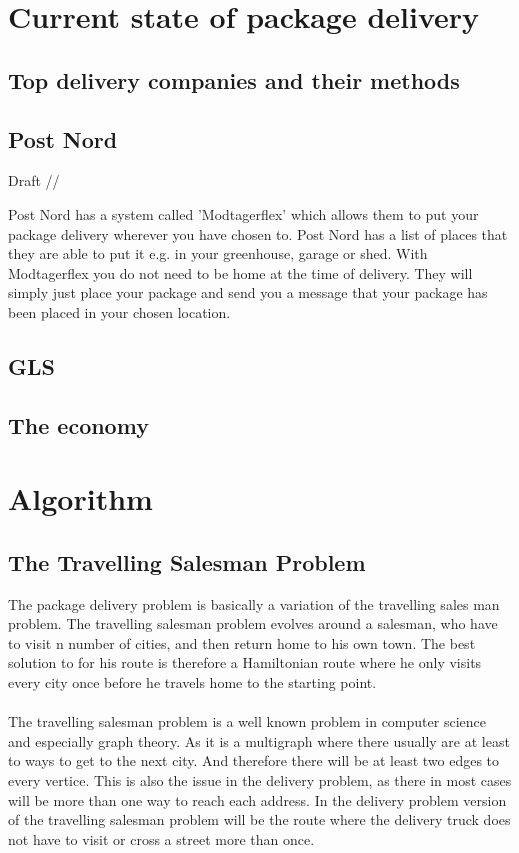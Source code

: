\documentclass[12pt]{report}
\begin{document}
\section{Current state of package delivery}
\subsection{Top delivery companies and their methods}


\subsection{Post Nord}
Draft //

Post Nord has a system called 'Modtagerflex' which allows them to put your package delivery wherever you have chosen to. Post Nord has a list of places that they are able to put it e.g. in your greenhouse, garage or shed. With Modtagerflex you do not need to be home at the time of delivery. They will simply just place your package and send you a message that your package has been placed in your chosen location.


\subsection{GLS}


\subsection{The economy}



\section{Algorithm}
\subsection{The Travelling Salesman Problem}
The package delivery problem is basically a variation of the travelling sales man problem. The travelling salesman problem evolves around a salesman, who have to visit n number of cities, and then return home to his own town. The best solution to for his route is therefore a Hamiltonian route where he only visits every city once before he travels home to the starting point. \\ \\
The travelling salesman problem is a well known problem in computer science and especially graph theory. As it is a multigraph where there usually are at least to ways to get to the next city. And therefore there will be at least two edges to every vertice. This is also the issue in the delivery problem, as there in most cases will be more than one way to reach each address. In the delivery problem version of the travelling salesman problem will be the route where the delivery truck does not have to visit or cross a street more than once.    
\end{document}
